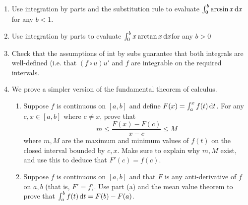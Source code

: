 \begin{exercises}
\begin{enumerate}
	\item Use integration by parts and the substitution rule to evaluate $\int_0^b\arcsin x\,{\mathrm{d} x}$ for any $b<1$.

  \item Use integration by parts to evaluate $\int_0^b x\arctan x\,{\mathrm{d} x}$for any $b>0$
  
  \item Check that the assumptions of int by subs guarantee that both integrals are well-defined (i.e. that $(f\circ u)u'$ and $f$ are integrable on the required intervals.

  
  \item\label{ex:ftceasy} We prove a simpler version of the fundamental theorem of calculus.
  \begin{enumerate}
    \item Suppose $f$ is continuous on $[a,b]$ and define $F(x)=\int_a^xf(t)\,{\mathrm{d} t}$. For any $c,x\in[a,b]$ where $c\neq x$, prove that
    \[m\le\frac{F(x)-F(c)}{x-c}\le M\]
    where $m,M$ are the maximum and minimum values of $f(t)$ on the closed interval bounded by $c,x$. Make sure to explain why $m,M$ exist, and use this to deduce that $F'(c)=f(c)$.
    \item Suppose $f$ is continuous on $[a,b]$ and that $F$ is any anti-derivative of $f$ on $a,b$ (that is, $F'=f$). Use part (a) and the mean value theorem to prove that $\int_a^bf(t)\,{\mathrm{d} t}=F(b)-F(a)$.
  \end{enumerate}
  
%   
  

\end{enumerate}
\end{exercises}
\vfil
\goodbreak

